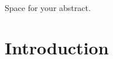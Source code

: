 \documentclass[a4paper,oneside,10pt,ngerman,english]{scrartcl}
\begin{document}



\maketitle


\cleardoubleoddpage
\tableofcontents




\cleardoubleoddpage


Space for your abstract.




\cleardoubleoddpage

\section{Introduction}
\label{sec:introduction}
\end{document}

